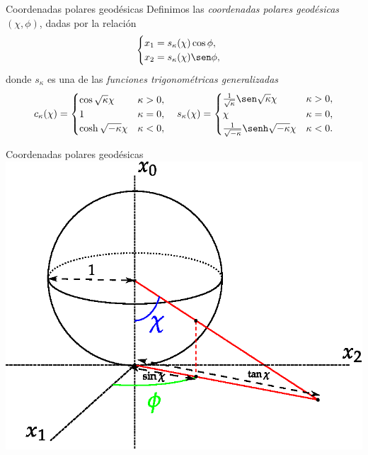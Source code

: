 \documentclass[aspectratio=169,mathserif]{beamer}
\begin{document}
  \begin{frame}{Coordenadas polares geodésicas}
    Definimos las \emph{coordenadas polares geodésicas} $(\chi,\phi)$, dadas por la relación
    \begin{equation*}
      \begin{cases}
	x_1=s_{\kappa}(\chi)\cos\phi,\\
	x_2=s_{\kappa}(\chi)\sen\phi,
      \end{cases}
    \end{equation*}
    donde $s_{\kappa}$ es una de las \emph{funciones trigonométricas generalizadas}
 \begin{equation*}
  c_{\kappa}(\chi)=
  \begin{cases}
    \cos \sqrt{\kappa} \chi & \kappa >0, \\
    1 & \kappa =0, \\
    \cosh \sqrt{-\kappa} \chi & \kappa <0, 
  \end{cases}
  \ \ \ 
  s_{\kappa}(\chi)=
  \begin{cases}
    \frac{1}{\sqrt{\kappa}}\sen \sqrt{\kappa} \chi & \kappa >0, \\
    \chi & \kappa =0, \\
    \frac{1}{\sqrt{-\kappa}}\senh \sqrt{-\kappa} \chi & \kappa <0. 
  \end{cases}
\end{equation*}
 \end{frame}

 \begin{frame}{Coordenadas polares geodésicas}
   \centering
   \includegraphics{esfera}
 \end{frame}
\end{document}
